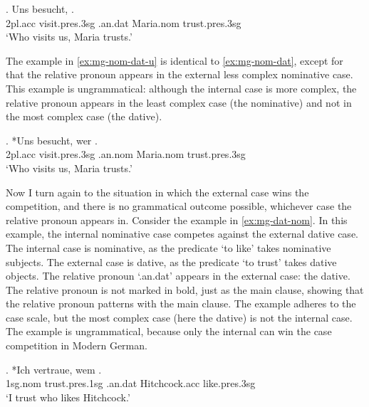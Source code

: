 \exg. Uns besucht,   .\\
2\ac{pl}.\ac{acc} visit.\ac{pres}.3\ac{sg}\scsub{[nom]} .\ac{an}.\ac{dat} Maria.\ac{nom} trust.\ac{pres}.3\ac{sg}\scsub{[dat]}\\
`Who visits us, Maria trusts.' \label{ex:mg-nom-dat}

The example in \ref{ex:mg-nom-dat-u} is identical to \ref{ex:mg-nom-dat}, except for that the relative pronoun appears in the external less complex nominative case. This example is ungrammatical: although the internal case is more complex, the relative pronoun appears in the least complex case (the nominative) and not in the most complex case (the dative).

\exg. *Uns besucht, wer  .\\
2\ac{pl}.\ac{acc} visit.\ac{pres}.3\ac{sg}\scsub{[nom]} .\ac{an}.\ac{nom} Maria.\ac{nom} trust.\ac{pres}.3\ac{sg}\scsub{[dat]}\\
`Who visits us, Maria trusts.' \label{ex:mg-nom-dat-u}

Now I turn again to the situation in which the external case wins the competition, and there is no grammatical outcome possible, whichever case the relative pronoun appears in.
Consider the example in \ref{ex:mg-dat-nom}. In this example, the internal nominative case competes against the external dative case.
The internal case is nominative, as the predicate  `to like' takes nominative subjects.
The external case is dative, as the predicate  `to trust' takes dative objects.
The relative pronoun  `.\ac{an}.\ac{dat}' appears in the external case: the dative. The relative pronoun is not marked in bold, just as the main clause, showing that the relative pronoun patterns with the main clause.
The example adheres to the case scale, but the most complex case (here the dative) is not the internal case. The example is ungrammatical, because only the internal can win the case competition in Modern German.

\exg. *Ich vertraue, wem  .\\
1\ac{sg}.\ac{nom} trust.\ac{pres}.1\ac{sg}\scsub{[dat]} .\ac{an}.\ac{dat} Hitchcock.\ac{acc} like.\ac{pres}.3\ac{sg}\scsub{[nom]}\\
`I trust who likes Hitchcock.' \label{ex:mg-dat-nom}

